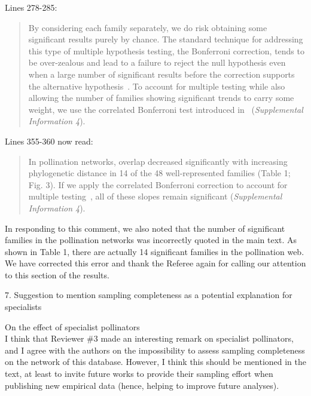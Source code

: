 \documentclass[12pt]{letter}
\newenvironment{refquote}{\bigskip \begin{it}}{\end{it}\smallskip}
\begin{document}
		Lines 278-285:

		\begin{quotation}

			By considering each family separately, we do risk obtaining some significant results purely by chance. The standard technique for addressing this type of multiple hypothesis testing, the Bonferroni correction, tends to be over-zealous and lead to a failure to reject the null hypothesis even when a large number of significant results before the correction supports the alternative hypothesis~\citep{Moran2003}. To account for multiple testing while also allowing the number of families showing significant trends to carry some weight, we use the correlated Bonferroni test introduced in~\citet{Drezner2016} (\emph{Supplemental Information 4}).

		\end{quotation}


		Lines 355-360 now read:

		\begin{quotation}
			 In pollination networks, overlap decreased significantly with increasing phylogenetic distance in 14 of the 48 well-represented families (Table 1; Fig. 3). If we apply the correlated Bonferroni correction to account for multiple testing~\citep{Drezner2016}, all of these slopes remain significant (\emph{Supplemental Information 4}).
		\end{quotation}


		In responding to this comment, we also noted that the number of significant families in the pollination networks was incorrectly quoted in the main text. As shown in Table 1, there are actually 14 significant families in the pollination web. We have corrected this error and thank the Referee again for calling our attention to this section of the results.


	7. Suggestion to mention sampling completeness as a potential explanation for specialists


		\begin{refquote}
			On the effect of specialist pollinators\\

			I think that Reviewer \#3 made an interesting remark on specialist pollinators, and I agree with the authors on the impossibility to assess sampling completeness on the network of this database. However, I think this should be mentioned in the text, at least to invite future works to provide their sampling effort when publishing new empirical data (hence, helping to improve future analyses).
		\end{refquote}
\end{document}

